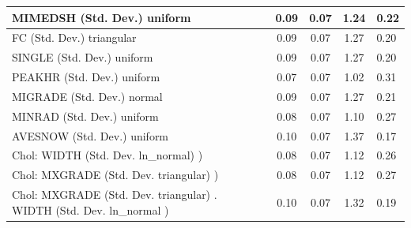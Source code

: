 \begin{table}
\begin{center}
\begin{tabular}{|l|l|c|c|c|l|}
			MIMEDSH (Std. Dev.) uniform &  & 0.09 & 0.07 & 1.24 & 0.22 \\
			\hline
			FC (Std. Dev.) triangular &  & 0.09 & 0.07 & 1.27 & 0.20 \\
			\hline
			SINGLE (Std. Dev.) uniform &  & 0.09 & 0.07 & 1.27 & 0.20 \\
			\hline
			PEAKHR (Std. Dev.) uniform &  & 0.07 & 0.07 & 1.02 & 0.31 \\
			\hline
			MIGRADE (Std. Dev.) normal &  & 0.09 & 0.07 & 1.27 & 0.21 \\
			\hline
			MINRAD (Std. Dev.) uniform &  & 0.08 & 0.07 & 1.10 & 0.27 \\
			\hline
			AVESNOW (Std. Dev.) uniform &  & 0.10 & 0.07 & 1.37 & 0.17 \\
			\hline
			 Chol: WIDTH (Std. Dev. ln_normal) ) &  & 0.08 & 0.07 & 1.12 & 0.26 \\
			\hline
			 Chol: MXGRADE (Std. Dev. triangular) ) &  & 0.08 & 0.07 & 1.12 & 0.27 \\
			\hline
			 Chol: MXGRADE (Std. Dev. triangular) . WIDTH (Std. Dev.   ln_normal ) &  & 0.10 & 0.07 & 1.32 & 0.19 \\
			\hline
		\end{tabular}
	\end{center}
\end{table}